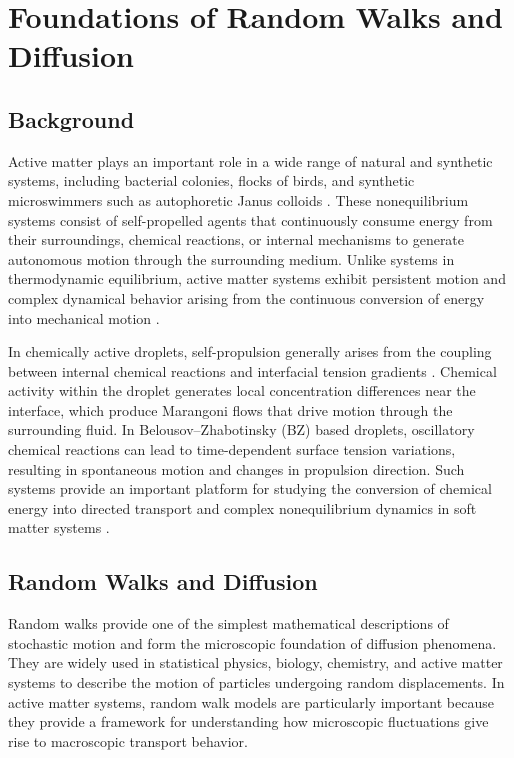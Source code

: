 \chapter{Foundations of Random Walks and Diffusion}

\section{Background}

Active matter plays an important role in a wide range of natural and synthetic systems, including bacterial colonies, flocks of birds, and synthetic microswimmers such as autophoretic Janus colloids \cite{vrugt2025}. These nonequilibrium systems consist of self-propelled agents that continuously consume energy from their surroundings, chemical reactions, or internal mechanisms to generate autonomous motion through the surrounding medium. Unlike systems in thermodynamic equilibrium, active matter systems exhibit persistent motion and complex dynamical behavior arising from the continuous conversion of energy into mechanical motion \cite{vrugt2025,balakrishnan2021}.

In chemically active droplets, self-propulsion generally arises from the coupling between internal chemical reactions and interfacial tension gradients \cite{izzet2020,FastMoving2021article,Shajahan2026}. Chemical activity within the droplet generates local concentration differences near the interface, which produce Marangoni flows that drive motion through the surrounding fluid. In Belousov–Zhabotinsky (BZ) based droplets, oscillatory chemical reactions can lead to time-dependent surface tension variations, resulting in spontaneous motion and changes in propulsion direction. Such systems provide an important platform for studying the conversion of chemical energy into directed transport and complex nonequilibrium dynamics in soft matter systems \cite{izzet2020,vrugt2025}.

\section{Random Walks and Diffusion}

Random walks \cite{pearson1905,klafter2011,resnick1992} provide one of the simplest mathematical descriptions of stochastic motion and form the microscopic foundation of diffusion phenomena. They are widely used in statistical physics, biology, chemistry, and active matter systems to describe the motion of particles undergoing random displacements. In active matter systems, random walk models are particularly important because they provide a framework for understanding how microscopic fluctuations give rise to macroscopic transport behavior.

